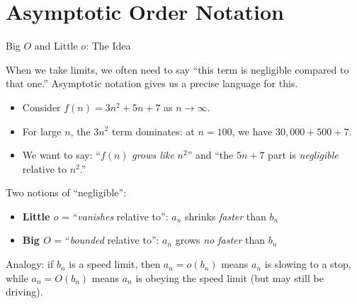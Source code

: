 \documentclass[handout, aspectratio=169]{beamer}
\numberwithin{equation}{section}
\begin{document}
\section{Asymptotic Order Notation}
\setcounter{subsection}{1}

\begin{frame}{Big $O$ and Little $o$: The Idea}

When we take limits, we often need to say ``this term is negligible compared to that one.'' Asymptotic notation gives us a precise language for this.

\pause

\begin{itemize}
\item Consider $f(n) = 3n^2 + 5n + 7$ as $n \to \infty$. \pause
\item For large $n$, the $3n^2$ term dominates: at $n = 100$, we have $30{,}000 + 500 + 7$. \pause
\item We want to say: ``$f(n)$ \emph{grows like} $n^2$'' and ``the $5n + 7$ part is \emph{negligible} relative to $n^2$.''
\end{itemize}

\pause

Two notions of ``negligible'':
\begin{itemize}
  \item \textbf{Little $o$} = ``\emph{vanishes} relative to'': \quad $a_n$ shrinks \emph{faster} than $b_n$
  \item \textbf{Big $O$} = ``\emph{bounded} relative to'': \quad $a_n$ grows \emph{no faster} than $b_n$
\end{itemize}

\pause

\begin{tcolorbox}[colback=blue!5, colframe=blue!50]
Analogy: if $b_n$ is a speed limit, then $a_n = o(b_n)$ means $a_n$ is slowing to a stop, while $a_n = O(b_n)$ means $a_n$ is obeying the speed limit (but may still be driving).
\end{tcolorbox}

\end{frame}

\end{document}
